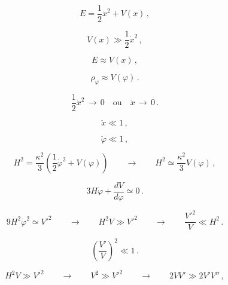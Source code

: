 \begin{equation}
E = \frac{1}{2}\dot{x}^2 + V(x) \, ,
\label{equation:2.3.2}
\end{equation} 

\begin{equation}
V(x) \gg \frac{1}{2}\dot{x}^2 \, ,
\label{equation:2.3.3}
\end{equation}

\begin{equation}
E \approx V(x)\, ,
\label{equation:2.3.4}
\end{equation}

\begin{equation}
\rho_{\varphi} \approx V(\varphi)\, .
\label{equation:2.3.5}
\end{equation}

\begin{equation}
\frac{1}{2}\dot{x}^2 \, \rightarrow \, 0 \quad \mathrm{ou} \quad \dot{x} \, \rightarrow \, 0 \, .
\label{equation:2.3.6}
\end{equation}

\begin{equation}
\ddot{x} \ll 1 \, ,
\label{equation:2.3.7} 
\end{equation}

\begin{equation}
\ddot{\varphi} \ll 1 \, ,
\label{equation:2.3.8}
\end{equation}

\begin{equation}
H^2 = \frac{\kappa^2}{3}\left( \frac{1}{2}\dot{\varphi}^2 + V(\varphi) \right) \qquad \longrightarrow \qquad H^2 \simeq \frac{\kappa^2}{3}V(\varphi) \, ,
\label{equation:2.3.9}
\end{equation}

\begin{equation}
3 H \dot{\varphi} + \dfrac{d V}{d \varphi} \simeq 0 \, .
\label{equation:2.3.10}
\end{equation}
 
\begin{equation}
9 H^2 \dot{\varphi}^2 \simeq V'^2 \qquad \rightarrow \qquad H^2 V \gg V'^2 \qquad \rightarrow \qquad \frac{V'^2}{V} \ll H^2 \, .
\label{equation:2.3.11}
\end{equation}

\begin{equation}
\left( \frac{V'}{V}\right)^2 \ll 1 \, .
\label{equation:2.3.12}
\end{equation}

\begin{equation}
H^2 V \gg V'^2 \qquad \rightarrow \qquad V^2 \gg V'^2 \qquad \rightarrow \qquad 2 V V' \gg 2 V' V'' \, ,
\label{equation:2.3.13}
\end{equation}

